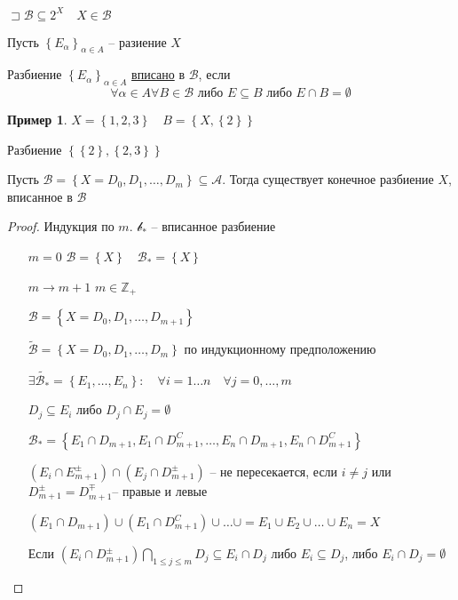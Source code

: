 \documentclass{book}
\newcommand\Z{\ensuremath{\mathbb{Z}}}
\renewcommand\O{\ensuremath{\emptyset}}
\newcommand{\tl}[1]{\widetilde{#1}}
\theoremstyle{definition}
\newtheorem*{example}{Пример}
\begin{document}
\begin{definition}
    $\sqsupset \mathcal B \subseteq 2^X\quad X\in \mathcal B$

    Пусть $\left\{ E_{\alpha} \right\} _{\alpha\in A}$ -- разиение $X$

    Разбиение  $\left\{ E_{\alpha} \right\} _{\alpha\in A}$ \underline{вписано} в $\mathcal B$, если \[\forall \alpha\in A \forall B\in \mathcal B \text{ либо } E\subseteq B \text{ либо } E\cap B = \O \]
\end{definition}

\begin{example}
    $X = \left\{ 1, 2, 3 \right\} \quad B = \left\{ X, \left\{ 2 \right\}  \right\} $

    Разбиение $\left\{ \left\{ 2 \right\} , \left\{ 2, 3 \right\}  \right\} $
\end{example}

\begin{lemma}
    Пусть  $\mathcal B = \left\{ X = D_0, D_1, \ldots, D_m \right\} \subseteq \mathcal A$. Тогда существует конечное разбиение $X$, вписанное в  $\mathcal B$
\end{lemma}

\begin{proof}
    Индукция по $m$.  $\mathcal b_*$ -- вписанное разбиение

     \begin{enumerate}
         \item [$m = 0$] $\mathcal B = \left\{ X \right\} \quad \mathcal B_* = \left\{ X \right\} $ 
         \item [$m\to m+1$] $m\in \Z _+$

             $\mathcal B = \left\{ X = D_0, D_1, \ldots, D_{m+1} \right\} $

             $\tl {\mathcal B} = \left\{ X = D_0, D_1, \ldots, D_m \right\} $ по индукционному предположению

            $\exists \tl {\mathcal B_*} = \left\{ E_1, \ldots, E_n \right\} :\quad \forall i = 1 \ldots n\quad \forall j = 0, \ldots, m$

            $D_j\subseteq E_i$ либо $D_j\cap E_j = \O $

            $\mathcal B_* = \left\{ E_1\cap D_{m+1}, E_1\cap D_{m+1}^{C}, \ldots, E_n \cap D_{m+1}, E_n\cap D_{m+1}^C \right\} $

            $\left( E_i\cap E_{m+1}^{\pm} \right) \cap \left( E_j\cap D_{m+1}^{\pm} \right) $ -- не пересекается, если $i\neq j$ или $D_{m+1}^{\pm} = D_{m+1}^{\mp}$-- правые и левые

            $\left( E_1 \cap D_{m+1} \right) \cup \left( E_1\cap D_{m+1}^C \right) \cup  \ldots \cup  = E_1\cup E_2\cup \ldots\cup E_n = X$

            Если $\left( E_i \cap D_{m+1}^{\pm} \right) \bigcap\limits_{1\leqslant j\leqslant m}  D_j\subseteq E_i\cap D_j$ либо $E_i \subseteq D_j$, либо  $E_i \cap D_j = \O $
    \end{enumerate}     
\end{proof}
\end{document}
